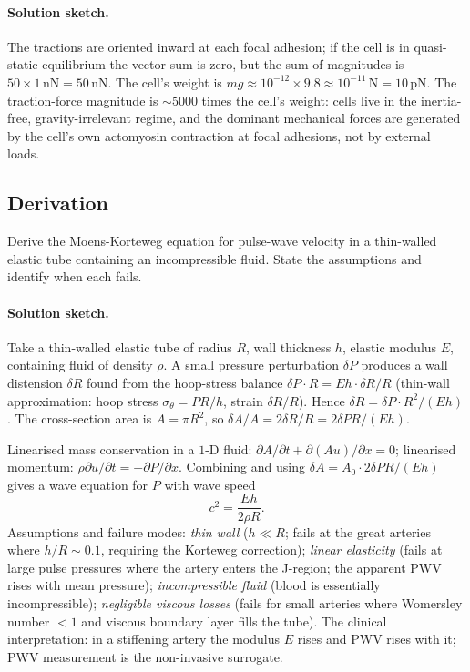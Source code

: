 \paragraph{Solution sketch.}
The tractions are oriented inward at each focal adhesion; if the
cell is in quasi-static equilibrium the vector sum is zero, but the
sum of magnitudes is $50 \times 1\,\text{nN} = 50\,\text{nN}$. The
cell's weight is $m g \approx 10^{-12} \times 9.8 \approx
10^{-11}\,\text{N} = 10\,\text{pN}$. The traction-force magnitude is
$\sim 5000$ times the cell's weight: cells live in the inertia-free,
gravity-irrelevant regime, and the dominant mechanical forces are
generated by the cell's own actomyosin contraction at focal
adhesions, not by external loads.

\subsection*{Derivation}

\begin{exercise}
Derive the Moens-Korteweg equation for pulse-wave velocity in a
thin-walled elastic tube containing an incompressible fluid. State
the assumptions and identify when each fails.
\end{exercise}

\paragraph{Solution sketch.}
Take a thin-walled elastic tube of radius $R$, wall thickness $h$,
elastic modulus $E$, containing fluid of density $\rho$. A small
pressure perturbation $\delta P$ produces a wall distension
$\delta R$ found from the hoop-stress balance
$\delta P \cdot R = E h \cdot \delta R / R$ (thin-wall
approximation: hoop stress $\sigma_{\theta} = P R / h$, strain
$\delta R / R$). Hence
$\delta R = \delta P \cdot R^2 / (E h)$.
The cross-section area is $A = \pi R^2$, so
$\delta A / A = 2 \delta R / R = 2 \delta P R / (E h)$.

Linearised mass conservation in a $1$-D fluid:
$\partial A/\partial t + \partial (A u)/\partial x = 0$; linearised
momentum: $\rho \partial u/\partial t = -\partial P/\partial x$.
Combining and using $\delta A = A_0 \cdot 2\delta P R/(Eh)$ gives a
wave equation for $P$ with wave speed
\[
c^2 = \frac{E h}{2 \rho R}.
\]
Assumptions and failure modes: \emph{thin wall} ($h \ll R$; fails at
the great arteries where $h/R \sim 0.1$, requiring the Korteweg
correction); \emph{linear elasticity} (fails at large pulse pressures
where the artery enters the J-region; the apparent PWV rises with
mean pressure); \emph{incompressible fluid} (blood is essentially
incompressible); \emph{negligible viscous losses} (fails for small
arteries where Womersley number $< 1$ and viscous boundary layer
fills the tube). The clinical interpretation: in a stiffening
artery the modulus $E$ rises and PWV rises with it; PWV measurement
is the non-invasive surrogate.


